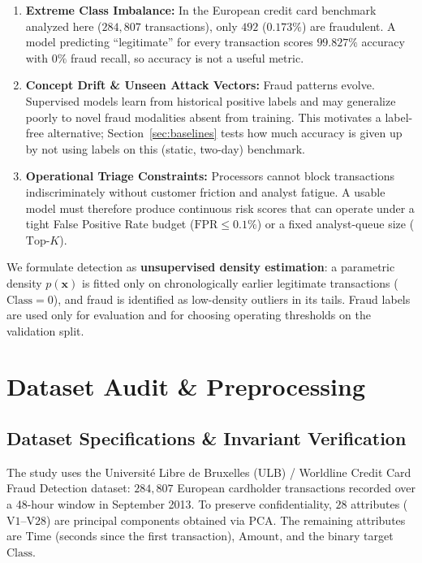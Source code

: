 \documentclass[11pt, a4paper]{article}
\begin{document}
\begin{enumerate}
    \item \textbf{Extreme Class Imbalance:} In the European credit card benchmark analyzed here ($284{,}807$ transactions), only $492$ ($0.173\%$) are fraudulent. A model predicting ``legitimate'' for every transaction scores $99.827\%$ accuracy with $0\%$ fraud recall, so accuracy is not a useful metric.
    \item \textbf{Concept Drift \& Unseen Attack Vectors:} Fraud patterns evolve. Supervised models learn from historical positive labels and may generalize poorly to novel fraud modalities absent from training. This motivates a label-free alternative; Section~\ref{sec:baselines} tests how much accuracy is given up by not using labels on this (static, two-day) benchmark.
    \item \textbf{Operational Triage Constraints:} Processors cannot block transactions indiscriminately without customer friction and analyst fatigue. A usable model must therefore produce continuous risk scores that can operate under a tight False Positive Rate budget ($\text{FPR} \le 0.1\%$) or a fixed analyst-queue size ($\text{Top-}K$).
\end{enumerate}

We formulate detection as \textbf{unsupervised density estimation}: a parametric density $p(\mathbf{x})$ is fitted only on chronologically earlier legitimate transactions ($\text{Class} = 0$), and fraud is identified as low-density outliers in its tails. Fraud labels are used only for evaluation and for choosing operating thresholds on the validation split.

\section{Dataset Audit \& Preprocessing}

\subsection{Dataset Specifications \& Invariant Verification}
The study uses the Universit\'e Libre de Bruxelles (ULB) / Worldline Credit Card Fraud Detection dataset: $284{,}807$ European cardholder transactions recorded over a 48-hour window in September 2013. To preserve confidentiality, $28$ attributes ($\text{V1}$--$\text{V28}$) are principal components obtained via PCA. The remaining attributes are $\text{Time}$ (seconds since the first transaction), $\text{Amount}$, and the binary target $\text{Class}$.
\end{document}
